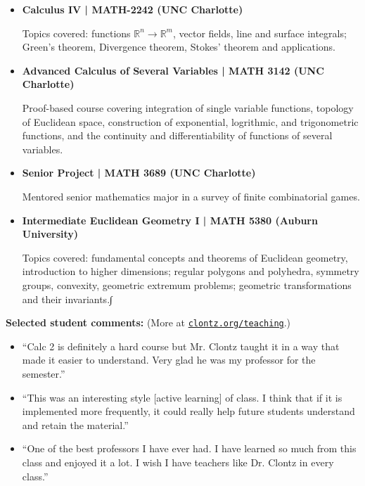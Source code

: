 \documentclass{article}
\begin{document}
\begin{itemize}
  \item
    \textbf{Calculus IV | MATH-2242 (UNC Charlotte)}

    Topics covered: functions \(\mathbb R^n\to\mathbb R^m\), vector fields,
    line and surface integrals; Green's theorem, Divergence theorem,
    Stokes' theorem and applications.

  \item
    \textbf{Advanced Calculus of Several Variables | MATH 3142 (UNC Charlotte)}

      Proof-based course covering integration of single variable functions,
      topology of Euclidean space, construction of exponential, logrithmic,
      and trigonometric functions, and the
      continuity and differentiability of functions of several variables.


  \item
    \textbf{Senior Project | MATH 3689 (UNC Charlotte)}

    Mentored senior mathematics major in a survey of finite combinatorial games.
  \item
    \textbf{Intermediate Euclidean Geometry I | MATH 5380 (Auburn University)}

    Topics covered: fundamental concepts and theorems of Euclidean geometry,
    introduction to higher dimensions; regular polygons and polyhedra,
    symmetry groups, convexity, geometric extremum problems; geometric
    transformations and their invariants.∫

\end{itemize}

\noindent
\textbf{Selected student comments:} (More at \href{http://clontz.org/teaching/}{\nolinkurl{clontz.org/teaching}}.)
    \begin{itemize}
      \item ``Calc 2 is definitely a hard course but Mr. Clontz taught it in a way that made it easier to understand. Very glad he was my professor for the semester.''
      \item ``This was an interesting style [active learning] of class. I think that if it is implemented more frequently, it could really help future students understand and retain the material.''
      \item ``One of the best professors I have ever had. I have learned so much from this class and enjoyed it a lot. I wish I have teachers like Dr. Clontz in every class.''
    \end{itemize}
\end{document}
